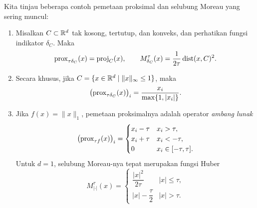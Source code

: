 \begin{example}
    Kita tinjau beberapa contoh pemetaan proksimal dan selubung Moreau yang sering muncul:
    \begin{enumerate}
        \item Misalkan \(C\subset\mathbb{R}^d\) tak kosong, tertutup, dan konveks, dan perhatikan fungsi indikator \(\delta_C\). Maka
        \begin{equation}
            \mathrm{prox}_{\tau\delta_C}(x)=\mathrm{proj}_C(x),
            \qquad
            M_{\delta_C}^{\tau}(x)=\frac{1}{2\tau}\operatorname{dist}(x,C)^2.
        \end{equation}
        \item Secara khusus, jika \(C=\{x\in\mathbb{R}^d\mid\|x\|_\infty\leq1\}\), maka
        \begin{equation}
            \bigl(\mathrm{prox}_{\tau\delta_C}(x)\bigr)_i
            =\frac{x_i}{\max\{1,|x_i|\}}.
        \end{equation}
        \item Jika \(f(x)=\|x\|_1\), pemetaan proksimalnya adalah operator \emph{ambang lunak}
        \begin{equation}
            \bigl(\mathrm{prox}_{\tau f}(x)\bigr)_i=
            \begin{cases}
                x_i-\tau & x_i>\tau,\\
                x_i+\tau & x_i<-\tau,\\
                0 & x_i\in[-\tau,\tau].
            \end{cases}
        \end{equation}
        Untuk \(d=1\), selubung Moreau-nya tepat merupakan fungsi Huber
        \begin{equation}
            M_{|\cdot|}^{\tau}(x)=
            \begin{cases}
                \dfrac{|x|^2}{2\tau} & |x|\leq\tau,\\
                |x|-\dfrac{\tau}{2} & |x|>\tau.
            \end{cases}
        \end{equation}
    \end{enumerate}
\end{example}

